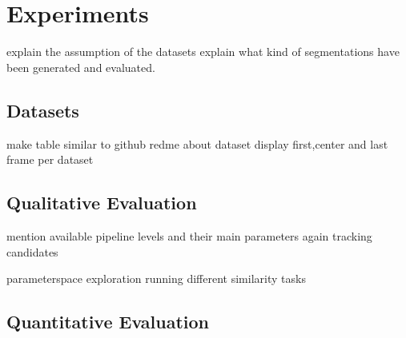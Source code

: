 \chapter{Experiments}
explain the assumption of the datasets
explain what kind of segmentations have been generated and evaluated.

\section{Datasets}
make table similar to github redme about dataset
display first,center and last frame per dataset

\section{Qualitative Evaluation}
mention available pipeline levels and their main parameters again
tracking candidates



parameterspace exploration
running different similarity tasks



\section{Quantitative Evaluation}
